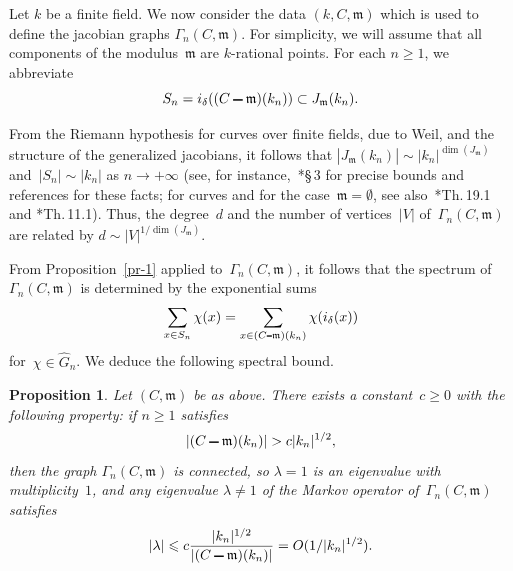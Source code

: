 \documentclass[12pt]{amsart}
\renewcommand{\leq}{\leqslant}
\renewcommand{\geq}{\geqslant}
\numberwithin{equation}{section}
\def\setminus{\mathchoice
    {\mathbin{\vrule height .62ex width 1.61ex depth -.38ex}}%
    {\mathbin{\vrule height .62ex width 1.61ex depth -.38ex}}%
    {\mathbin{\vrule height .50ex width 0.85ex depth -.28ex}}%
    {\mathbin{\vrule height .20ex width 0.570ex depth -.24ex}}%
}
\newcommand{\mfm}{\mathfrak{m}}
\theoremstyle{plain}
\newtheorem{proposition}[theorem]{Proposition}
\theoremstyle{remark}
\theoremstyle{definition}
\renewcommand{\geq}{\geqslant}
\renewcommand{\leq}{\leqslant}
\begin{document}
Let $k$ be a finite field. We now consider the data $(k,C,\mfm)$ which is used to define the jacobian graphs $\Gamma_n(C,\mfm)$.  For
simplicity, we will assume that all components of the modulus~$\mfm$ are
$k$-rational points. For each $n \geq 1$, we abbreviate
\[
S_n=i_{\delta}((C\setminus\mfm)(k_n)) \subset J_{\mathfrak{m}}(k_n). 
\]

From the Riemann hypothesis for curves over finite fields, due to Weil,
and the structure of the generalized jacobians, it follows that
$|J_{\mathfrak{m}}(k_n)|\sim |k_n|^{\dim(J_{\mfm})}$ and~$|S_n|\sim |k_n|$ as
$n\to+\infty$ (see, for instance,~\cite{ffk2}*{\S\,3} for precise bounds
and references for these facts; for curves and for the
case~$\mfm=\emptyset$, see also~\cite{milne1}*{Th.\,19.1} and
\cite{milne2}*{Th.\,11.1}). Thus, the degree~$d$ and the number of
vertices~$|V|$ of~$\Gamma_n(C,\mfm)$ are related by
$d\sim |V|^{1/\dim(J_{\mfm})}$.

From Proposition~\ref{pr-1} applied to~$\Gamma_n(C,\mfm)$, it follows
that the spectrum of~$\Gamma_n(C,\mfm)$ is determined by the
exponential sums
\[
  \sum_{x\in S_n}\chi(x)=\sum_{x\in
    (C\setminus\mfm)(k_n)}\chi(i_{\delta}(x))
\]
for~$\chi\in\widehat{G}_n$. We deduce the following spectral bound.

\begin{proposition}\label{pr-max-spectrum}
  Let $(C,\mfm)$ be as above. There exists a constant~$c\geq 0$ with the
  following property: if $n\geq 1$ satisfies
  \[
    |(C\setminus\mfm)(k_n)|>c|k_n|^{1/2},
  \]
  then the graph $\Gamma_n(C,\mfm)$ is connected, so $\lambda=1$ is an
  eigenvalue with multiplicity~$1$, and any eigenvalue $\lambda\neq 1$
  of the Markov operator of~$\Gamma_n(C,\mfm)$ satisfies
  \[
    |\lambda|\leq c\frac{|k_n|^{1/2}}{|(C\setminus\mfm)(k_n)|}
    =O(1/|k_n|^{1/2}).
  \]
\end{proposition}
\end{document}
